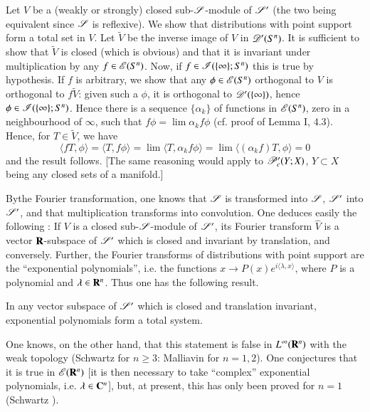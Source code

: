 Let $V$ be a (weakly or strongly) closed sub-$\mathscr{S}$-module of $\mathscr{S}'$ (the two being equivalent since $\mathscr{S}$ is reflexive). We show that distributions with point support form a total set in $V$. Let $\widetilde{V}$ be the inverse image of $V$ in $\mathscr{D}'(S^{n})$. It is sufficient to show that $\widetilde{V}$ is closed (which is obvious) and that it is invariant under multiplication by any $f\in \mathscr{E}(S^{n})$. Now, if $f\in \mathscr{I}(\{\infty\};S^{n})$ this is true by hypothesis. If $f$ is arbitrary, we show that any $\phi\in \mathscr{E}(S^{n})$ orthogonal to $V$ is orthogonal to $f\widetilde{V}$: given such a $\phi$, it is orthogonal to $\mathscr{D}'(\{\infty\})$, hence $\phi\in \mathscr{I}(\{\infty\};S^{n})$. Hence there is a sequence $\{\alpha_{k}\}$ of functions in $\mathscr{E}(S^{n})$, zero in a neighbourhood of $\infty$, such that $f\phi=\lim \alpha_{k}f\phi$ (cf. proof of Lemma I, 4.3). Hence, for $T\in\widetilde{V}$, we have
$$
\langle fT,\phi\rangle=\langle T,f\phi\rangle=\lim \langle T,\alpha_{k}f\phi\rangle=\lim \langle (\alpha_{k}f)T,\phi\rangle=0
$$
and the result follows. [The same reasoning would apply to $\mathscr{P}'_{c}(Y;X)$, $Y\subset X$ being any closed sets of a manifold.]

\eject

By\pageoriginale the Fourier transformation, one knows that $\mathscr{S}$ is transformed into $\mathscr{S}$, $\mathscr{S}'$ into $\mathscr{S}'$, and that multiplication transforms into convolution. One deduces easily the following : If $V$ is a closed sub-$\mathscr{S}$-module of $\mathscr{S}'$, its Fourier transform $\widehat{V}$ is a vector $\mathbf{R}$-subspace of $\mathscr{S}'$ which is closed and invariant by translation, and conversely. Further, the Fourier transforms of distributions with point support are the ``exponential polynomials'', i.e. the functions $x\to P(x)e^{i\langle \lambda,x\rangle}$, where $P$ is a polynomial and $\lambda\in \mathbf{R}^{n}$. Thus one has the following result.

\begin{theorem}\label{chap7-thm3.2}
In any vector subspace of $\mathscr{S}'$ which is closed and translation invariant, exponential polynomials form a total system.
\end{theorem}

One knows, on the other hand, that this statement is false in $L^{\infty}(\mathbf{R}^{n})$ with the weak topology (Schwartz for $n\geq 3$: Malliavin for $n=1,2$). One conjectures that it is true in $\mathscr{E}(\mathbf{R}^{n})$ [it is then necessary to take ``complex'' exponential polynomials, i.e. $\lambda\in \mathbf{C}^{n}$], but, at present, this has only been proved for $n=1$ (Schwartz \cite{L. Schwartz : 3}).

